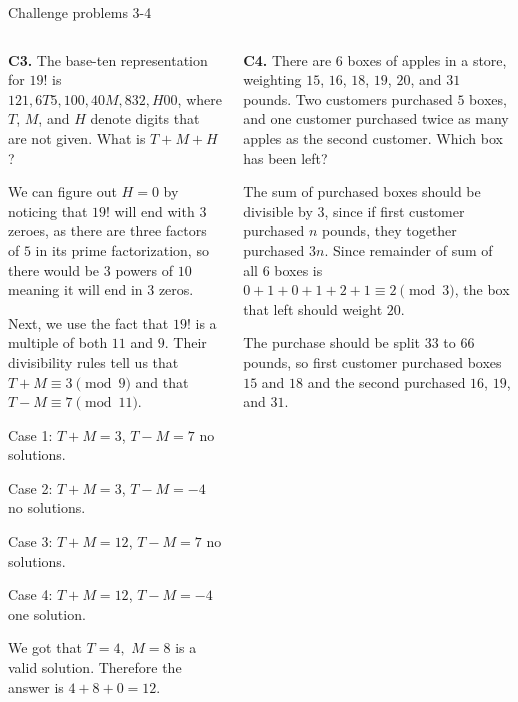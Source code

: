 \documentclass[9pt,aspectratio=169]{beamer}
\begin{document}
\begin{frame}{Challenge problems 3-4}
  \begin{columns}[T]
    \begin{column}{0.5\textwidth}
      \begin{problem}
        \textbf{C3.} The base-ten representation for $19!$ is $121{,}6T5{,}100{,}40M{,}832{,}H00$, where $T$, $M$, and $H$ denote digits that are not given. What is $T+M+H$?
      \end{problem}\pause
      We can figure out $H = 0$ by noticing that $19!$ will end with $3$ zeroes, as there are three factors of $5$ in its prime factorization, so there would be $3$ powers of $10$ meaning it will end in $3$ zeros. 
      
      Next, we use the fact that $19!$ is a multiple of both $11$ and $9$. Their divisibility rules tell us that $T + M \equiv 3 \pmod{9}$ and that $T - M \equiv 7 \pmod{11}$. \pause
      
      Case 1: $T + M = 3$, $T - M = 7$ no solutions.
      
      Case 2: $T + M = 3$, $T - M = -4$ no solutions.

      Case 3: $T + M = 12$, $T - M = 7$ no solutions.

      Case 4: $T + M = 12$, $T - M = -4$ one solution.

      We got that $T = 4,$ $M = 8$ is a valid solution. Therefore the answer is $4 + 8 + 0 = \boxed{12}$.\pause
    \end{column}
    \begin{column}{0.5\textwidth}
      \begin{problem}
        \textbf{C4.} There are $6$ boxes of apples in a store, weighting $15$, $16$, $18$, $19$, $20$, and $31$ pounds. Two customers purchased $5$ boxes, and one customer purchased twice as many apples as the second customer. Which box has been left?
      \end{problem}\pause
      The sum of purchased boxes should be divisible by $3$, since if first customer purchased $n$ pounds, they together purchased $3n$. Since remainder of sum of all $6$ boxes is $0 + 1 + 0 + 1 + 2 + 1 \equiv 2 \pmod{3}$, the box that left should weight $\boxed{20}$.
      
      The purchase should be split $33$ to $66$ pounds, so first customer purchased boxes $15$ and $18$ and the second purchased $16$, $19$, and $31$.
    \end{column}
  \end{columns}
\end{frame}

\end{document}
